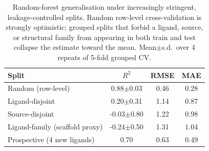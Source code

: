 \begin{table}[htbp]
\centering
\caption{Random-forest generalisation under increasingly stringent, leakage-controlled splits. Random row-level cross-validation is strongly optimistic; grouped splits that forbid a ligand, source, or structural family from appearing in both train and test collapse the estimate toward the mean. Mean$\pm$s.d.\ over 4 repeats of 5-fold grouped CV.}
\label{tab:splits}
\begin{tabular}{lccc}
\toprule
Split & $R^2$ & RMSE & MAE \\
\midrule
Random (row-level) & 0.88$\pm$0.03 & 0.46 & 0.28 \\
Ligand-disjoint & 0.20$\pm$0.31 & 1.14 & 0.87 \\
Source-disjoint & -0.03$\pm$0.80 & 1.22 & 0.98 \\
Ligand-family (scaffold proxy) & -0.24$\pm$0.50 & 1.31 & 1.04 \\
\midrule
Prospective (4 new ligands) & 0.70 & 0.63 & 0.49 \\
\bottomrule
\end{tabular}
\end{table}
